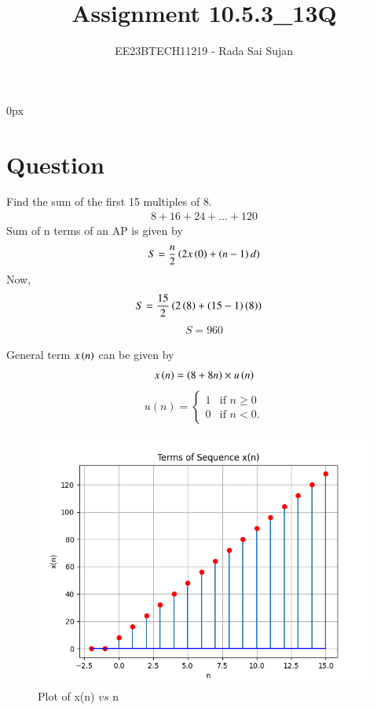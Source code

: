 \documentclass[journal,12pt,twocolumn]{IEEEtran}
\theoremstyle{remark}
\begin{document}
\parindent 0px

\title{Assignment 10.5.3\_13Q}
\author{EE23BTECH11219 - Rada Sai Sujan$^{}$%
}
\maketitle
\newpage
\bigskip
\section*{Question}
Find the sum of the first 15 multiples of 8. \\
\solution
\begin{align}
    8+16+24+\ldots+120
\end{align}
Sum of n terms of an AP is given by  \\
\begin{align}
    S=\dfrac{n}{2}\left(2x\left(0\right)+\left(n-1\right)d\right)
\end{align}
Now,
\begin{align}
    S &=\dfrac{15}{2}\left(2\left(8\right)+\left(15-1\right)\left(8\right)\right)   
\end{align}
\begin{align}
    \boxed{S =960}
\end{align}

General term $x\left(n\right)$ can be given by
\begin{align}
    x\left(n\right)=\left(8+8n\right) \times u\left(n\right)  \label{eq5}
\end{align}
\[ u(n) = \begin{cases}
        1 & \text{if } n \geq 0 \\
        0 & \text{if }  n< 0.
            \end{cases}\]
    \begin{figure}[ht]
        \centering
        \includegraphics[width=\columnwidth]{figs/a.png}
        \caption{Plot of x(n) $vs$ n}
        \label{fig:1}
    \end{figure}
\end{document}

